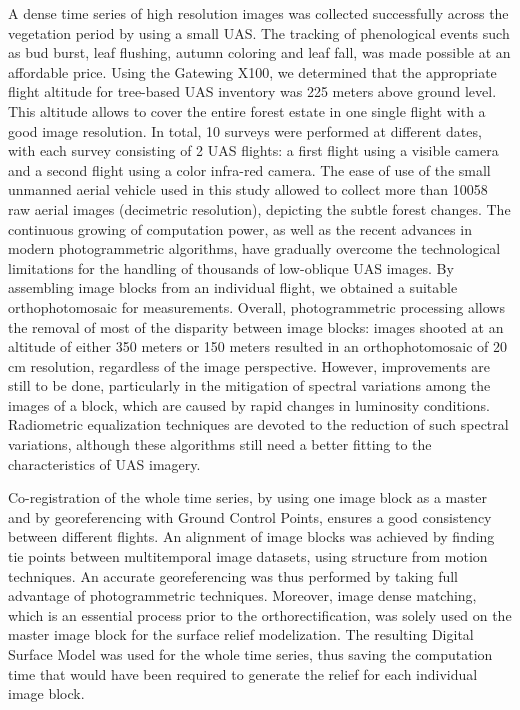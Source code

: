 \documentclass[remotesensing,article,submit,moreauthors,pdftex,12pt,a4paper]{mdpi} %
\begin{document}
A dense time series of high resolution images was collected successfully across the vegetation period by using a small UAS. 
The tracking of phenological events such as bud burst, leaf flushing, autumn coloring and leaf fall, was made possible at an affordable price. 
Using the Gatewing X100, we determined that the appropriate flight altitude for tree-based UAS inventory was 225 meters above ground level. 
This altitude allows to cover the entire forest estate in one single flight with a good image resolution. 
In total, 10 surveys were performed at different dates, with each survey consisting of 2 UAS flights: a first flight using a visible camera and a second flight using a color infra-red camera. 
The ease of use of the small unmanned aerial vehicle used in this study allowed to collect more than 10058 raw aerial images (decimetric resolution), depicting the subtle forest changes. 
The continuous growing of computation power, as well as the recent advances in modern photogrammetric algorithms, have gradually overcome the technological limitations for the handling of thousands of low-oblique UAS images. 
By assembling image blocks from an individual flight, we obtained a suitable orthophotomosaic for measurements. 
Overall, photogrammetric processing allows the removal of most of the disparity between image blocks: images shooted at an altitude of either 350 meters or 150 meters resulted in an orthophotomosaic of 20 cm resolution, regardless of the image perspective.
However, improvements are still to be done, particularly in the mitigation of spectral variations among the images of a block, which are caused by rapid changes in luminosity conditions.
Radiometric equalization techniques are devoted to the reduction of such spectral variations, although these algorithms still need a better fitting to the characteristics of UAS imagery.

Co-registration of the whole time series, by using one image block as a master and by georeferencing with Ground Control Points, ensures a good consistency between different flights. 
An alignment of image blocks was achieved by finding tie points between multitemporal image datasets, using structure from motion techniques. 
An accurate georeferencing was thus performed by taking full advantage of photogrammetric techniques.
Moreover, image dense matching, which is an essential process prior to the orthorectification, was solely used on the master image block for the surface relief modelization.
The resulting Digital Surface Model was used for the whole time series, thus saving the computation time that would have been required to generate the relief for each individual image block.
\end{document}
